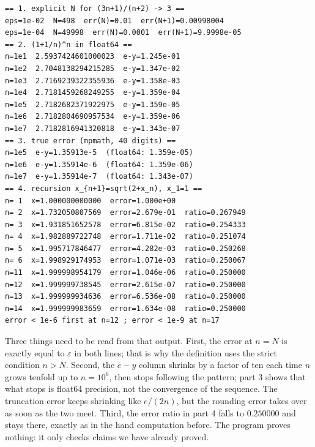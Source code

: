 \begin{verbatim}
== 1. explicit N for (3n+1)/(n+2) -> 3 ==
eps=1e-02  N=498  err(N)=0.01  err(N+1)=0.00998004
eps=1e-04  N=49998  err(N)=0.0001  err(N+1)=9.9998e-05
== 2. (1+1/n)^n in float64 ==
n=1e1  2.5937424601000023  e-y=1.245e-01
n=1e2  2.7048138294215285  e-y=1.347e-02
n=1e3  2.7169239322355936  e-y=1.358e-03
n=1e4  2.7181459268249255  e-y=1.359e-04
n=1e5  2.7182682371922975  e-y=1.359e-05
n=1e6  2.7182804690957534  e-y=1.359e-06
n=1e7  2.7182816941320818  e-y=1.343e-07
== 3. true error (mpmath, 40 digits) ==
n=1e5  e-y=1.35913e-5  (float64: 1.359e-05)
n=1e6  e-y=1.35914e-6  (float64: 1.359e-06)
n=1e7  e-y=1.35914e-7  (float64: 1.343e-07)
== 4. recursion x_{n+1}=sqrt(2+x_n), x_1=1 ==
n= 1  x=1.000000000000  error=1.000e+00
n= 2  x=1.732050807569  error=2.679e-01  ratio=0.267949
n= 3  x=1.931851652578  error=6.815e-02  ratio=0.254333
n= 4  x=1.982889722748  error=1.711e-02  ratio=0.251074
n= 5  x=1.995717846477  error=4.282e-03  ratio=0.250268
n= 6  x=1.998929174953  error=1.071e-03  ratio=0.250067
n=11  x=1.999998954179  error=1.046e-06  ratio=0.250000
n=12  x=1.999999738545  error=2.615e-07  ratio=0.250000
n=13  x=1.999999934636  error=6.536e-08  ratio=0.250000
n=14  x=1.999999983659  error=1.634e-08  ratio=0.250000
error < 1e-6 first at n=12 ; error < 1e-9 at n=17
\end{verbatim}

Three things need to be read from that output. First, the error at $n=N$ is exactly
equal to $\varepsilon$ in both lines; that is why the definition uses the strict
condition $n>N$. Second, the $e-y$ column shrinks by a factor of ten each time $n$ grows
tenfold up to $n=10^6$, then stops following the pattern; part 3 shows that what stops
is float64 precision, not the convergence of the sequence. The truncation error keeps
shrinking like $e/(2n)$, but the rounding error takes over as soon as the two meet.
Third, the error ratio in part 4 falls to $0.250000$ and stays there, exactly as in the
hand computation before. The program proves nothing: it only checks claims we have
already proved.


